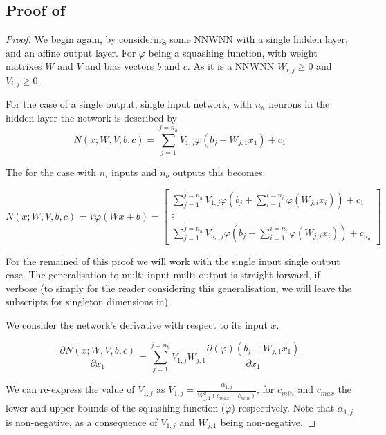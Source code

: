 \documentclass{article} %
\begin{document}
\subsection{Proof of }
\begin{proof}


We begin again, by considering some NNWNN with a single hidden layer, and an affine output layer.
For $\varphi$ being a squashing function, with weight matrixes $W$ and $V$ and bias vectors $b$ and $c$.
As it is a NNWNN $W_{i,j} \ge 0$ and $V_{i,j} \ge 0$.

For the case of a single output, single input network, with $n_h$ neurons in the hidden layer the network is described by
\begin{equation}
N(x;W,V,b,c) = \sum_{j=1}^{j=n_h} V_{1,j} \varphi (b_j+W_{j,1}x_1) + c_1
\end{equation}

The for the case with $n_i$ inputs and $n_o$ outputs this becomes:

\begin{equation}
N(x;W,V,b,c)=V\varphi(Wx+b)=\left[\begin{array}{c}
{\displaystyle \sum_{j=1}^{j=n_{h}}}V_{1,j}\varphi\left(b_{j}+\sum_{i=1}^{i=n_{i}}\varphi\left(W_{j,i}x_{i}\right)\right) + c_1\\
\vdots\\
{\displaystyle \sum_{j=1}^{j=n_{h}}}V_{n_{o},j}\varphi\left(b_{j}+\sum_{i=1}^{i=n_{i}}\varphi\left(W_{j,i}x_{i}\right)\right) +c_{n_o}
\end{array}\right]
\end{equation}

For the remained of this proof we will work with the single input single output case.
The generalisation to multi-input multi-output is straight forward, if verbose (to simply for the reader considering this generalisation, we will leave the subscripts for singleton dimensions in).

We consider the network's derivative with respect to its input $x$.

\begin{equation}
\frac{\partial N(x;W,V,b,c)}{\partial x_1} = \sum_{j=1}^{j=n_h} V_{1,j}W_{j,1} \frac{\partial(\varphi) (b_j+W_{j,1}x_1)}{\partial x_1}
\end{equation}

We can re-express the value of $V_{1,j}$ as $V_{1,j}=\frac{\alpha_{1,j}}{W_{j,1}^2(c_{max}-c_{min})}$,
for $c_{min}$ and $c_{max}$ the lower and upper bounds of the squashing function ($\varphi$) respectively.
Note that $\alpha_{1,j}$ is non-negative, as a consequence of $V_{1,j}$ and $W_{j,1}$ being non-negative.


\end{proof}
\end{document}
